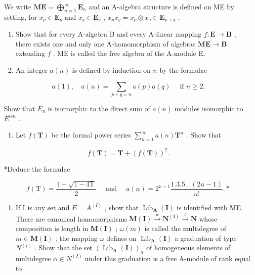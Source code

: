 We write \(\mathbf{ME} = \bigoplus_{n=1}^{\infty} \mathbf{E}_n\) and an A-algebra structure is defined on ME by setting, for \(x_p \in \mathbf{E}_p\) and \(x_q \in \mathbf{E}_q\) , \(x_p x_q = x_p \otimes x_q \in \mathbf{E}_{p+q}\) .

\begin{enumerate}
\def\labelenumi{(\alph{enumi})}
\item
  Show that for every A-algebra B and every A-linear mapping \(f: \mathbf{E} \to \mathbf{B}\) , there exists one and only one A-homomorphism of algebras \(\mathbf{ME} \to \mathbf{B}\) extending \(f\) . ME is called the free algebra of the A-module E.
\item
  An integer \(a(n)\) is defined by induction on \(n\) by the formulae
\end{enumerate}

\[
a (1), \quad a (n) = \sum_ {p + q = n} a (p) a (q) \quad \text { if } n \geqslant 2.
\]

Show that \(E_{n}\) is isomorphic to the direct sum of \(a(n)\) modules isomorphic to \(E^{\otimes n}\) .

\begin{enumerate}
\def\labelenumi{(\alph{enumi})}
\setcounter{enumi}{2}
\tightlist
\item
  Let \(f(\mathbf{T})\) be the formal power series \(\sum_{n=1}^{\infty} a(n)\mathbf{T}^n\) . Show that
\end{enumerate}

\[
f (\mathbf {T}) = \mathbf {T} + (f (\mathbf {T})) ^ {2}.
\]

*Deduce the formulae

\[
f (\mathrm{T}) = \frac {1 - \sqrt {1 - 4 \mathrm{T}}}{2} \quad \text { and } \quad a (n) = 2 ^ {n - 1} \frac {1 . 3 . 5 \dots (2 n - 1)}{n !}. *
\]

\begin{enumerate}
\def\labelenumi{(\alph{enumi})}
\setcounter{enumi}{3}
\tightlist
\item
  If I is any set and \(E = A^{(I)}\) , show that \(\operatorname{Lib}_{\mathbf{A}}(\mathbf{I})\) is identified with ME. There are canonical homomorphisms \(\mathbf{M}(\mathbf{I}) \xrightarrow{w} \mathbf{N}^{(\mathbf{I})} \xrightarrow{l} \mathbf{N}\) whose composition is length in \(\mathbf{M}(\mathbf{I})\) ; \(\omega(m)\) is called the multidegree of \(m \in \mathbf{M}(\mathbf{I})\) ; the mapping \(\omega\) defines on \(\operatorname{Lib}_{\mathbf{A}}(\mathbf{I})\) a graduation of type \(N^{(I)}\) . Show that the set \((\operatorname{Lib}_{\mathbf{A}}(\mathbf{I}))_{\alpha}\) of homogeneous elements of multidegree \(\alpha \in N^{(I)}\) under this graduation is a free A-module of rank equal to
\end{enumerate}

